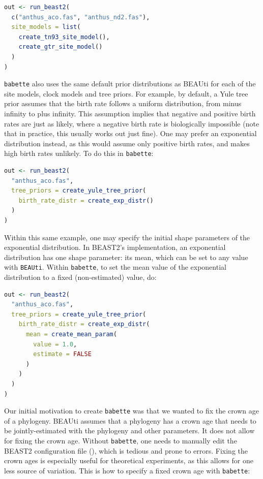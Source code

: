 \documentclass{article}
\begin{document}
\begin{lstlisting}[language=R, floatplacement=H]
out <- run_beast2(
  c("anthus_aco.fas", "anthus_nd2.fas"),
  site_models = list(
    create_tn93_site_model(), 
    create_gtr_site_model()
  )
)
\end{lstlisting}
\verb;babette; also uses the same default prior distributions as BEAUti 
for each of the site models, clock models and tree priors. 
For example, by default, a Yule tree prior assumes that the birth rate 
follows a uniform distribution, 
from minus infinity to plus infinity. 
This assumption implies that negative and positive birth rates are just as likely, 
where a negative birth rate is biologically impossible (note that 
in practice, this usually works out just fine).
One may prefer an exponential distribution instead, 
as this would assume only positive birth rates, 
and makes high birth rates unlikely.
To do this in \verb;babette;:

\begin{lstlisting}[language=R, floatplacement=H]
out <- run_beast2(
  "anthus_aco.fas",
  tree_priors = create_yule_tree_prior(
    birth_rate_distr = create_exp_distr()    
  )
)
\end{lstlisting}
Within this same example, one may specify
the initial shape parameters of the exponential distribution.
In BEAST2's implementation, an exponential distribution 
has one shape parameter: its mean, which can be set to any
value with \verb;BEAUti;. Within \verb;babette;, to set the 
mean value of the exponential distribution to a 
fixed (non-estimated) value, do: 

\begin{lstlisting}[language=R, floatplacement=H]
out <- run_beast2(
  "anthus_aco.fas",
  tree_priors = create_yule_tree_prior(
    birth_rate_distr = create_exp_distr(
      mean = create_mean_param(
        value = 1.0, 
        estimate = FALSE
      )
    )    
  )
)
\end{lstlisting}
Our initial motivation to create \verb;babette; 
was that we wanted to fix the crown age of a phylogeny.
BEAUti assumes that a phylogeny has a crown age that needs to be jointly-estimated
with the phylogeny and other parameters. It does not allow for fixing
the crown age. Without \verb;babette;, one needs to manually edit the BEAST2 
configuration file (\cite{fix_starting_tree}), which is tedious and prone to errors. 
Fixing the crown ages is especially useful for theoretical experiments,
as this allows for one less source of variation.
This is how to specify a fixed crown age with \verb;babette;:
\end{document}
